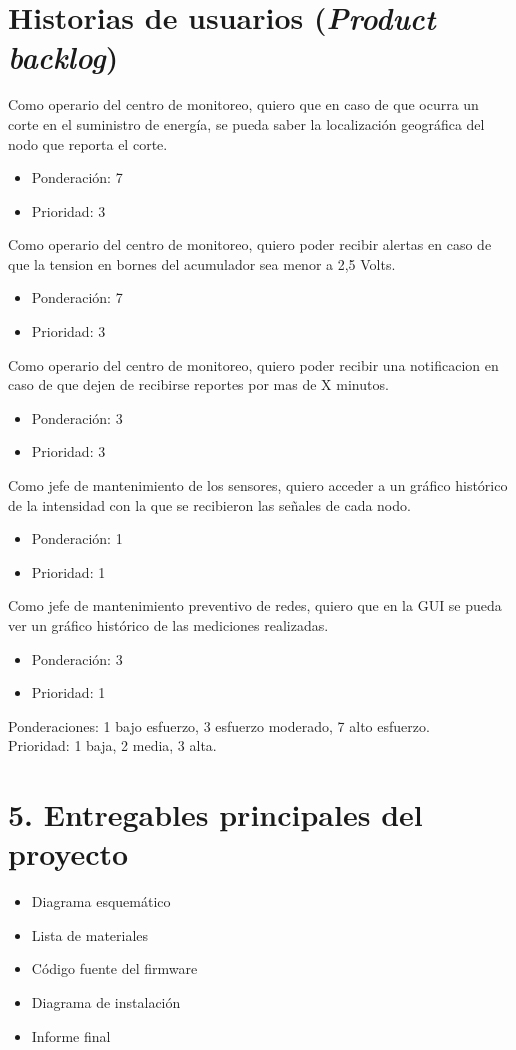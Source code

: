 \documentclass[11pt]{charter}
\begin{document}
\section{Historias de usuarios (\textit{Product backlog})}
\label{sec:backlog}
Como operario del centro de monitoreo, quiero que en caso de que ocurra un corte en el suministro de energía, se pueda saber la localización geográfica del nodo que reporta el corte.
\begin{itemize}
	\item Ponderación: 7
	\item Prioridad: 3
\end{itemize}

Como operario del centro de monitoreo, quiero poder recibir alertas en caso de que la tension en bornes del acumulador sea menor a 2,5 Volts.
\begin{itemize}
	\item Ponderación: 7
	\item Prioridad: 3
\end{itemize}

Como operario del centro de monitoreo, quiero poder recibir una notificacion en caso de que dejen de recibirse reportes por mas de X minutos.
\begin{itemize}
	\item Ponderación: 3
	\item Prioridad: 3
\end{itemize}

Como jefe de mantenimiento de los sensores, quiero acceder a un gráfico histórico de la intensidad con la que se recibieron las señales de cada nodo.
\begin{itemize}
	\item Ponderación: 1
	\item Prioridad: 1
\end{itemize}

Como jefe de mantenimiento preventivo de redes, quiero que en la GUI se pueda ver un gráfico histórico de las mediciones realizadas.
\begin{itemize}
	\item Ponderación: 3
	\item Prioridad: 1
\end{itemize}

Ponderaciones: 1 bajo esfuerzo, 3 esfuerzo moderado, 7 alto esfuerzo.\\
Prioridad: 1 baja, 2 media, 3 alta.

\section{5. Entregables principales del proyecto}
\label{sec:entregables}
\begin{itemize}
\item Diagrama esquemático
\item Lista de materiales
\item Código fuente del firmware
\item Diagrama de instalación
\item Informe final
\end{itemize}
\end{document}
